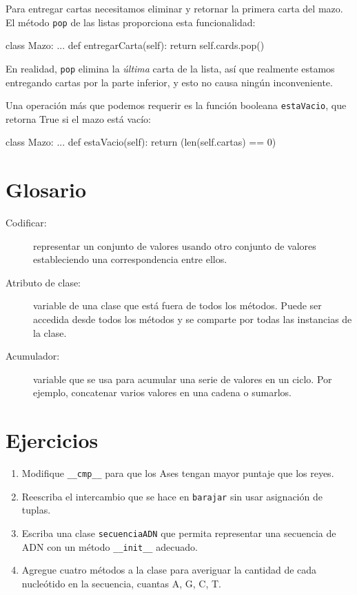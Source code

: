 Para entregar cartas necesitamos eliminar y retornar la primera carta
del mazo. El método \texttt{pop} de las listas proporciona esta funcionalidad:
\begin{pythoncode}
class Mazo:
  ...
  def entregarCarta(self):
    return self.cards.pop()
\end{pythoncode}
 En realidad, \texttt{pop} elimina la {\em última} carta de la
lista, así que realmente estamos entregando cartas por la parte inferior,
y esto no causa ningún inconveniente.

 

Una operación más que podemos requerir es la función booleana \texttt{estaVacio},
que retorna True si el mazo está vacío:

\begin{pythoncode}
class Mazo:
  ...
  def estaVacio(self):
    return (len(self.cartas) == 0)
\end{pythoncode}

\section{Glosario}
\begin{description}
\item [{Codificar:}] representar un conjunto de valores usando otro conjunto
de valores estableciendo una correspondencia entre ellos.
\item [{Atributo de clase:}] variable de una clase que está fuera de todos
los métodos. Puede ser accedida desde todos los métodos y se comparte
por todas las instancias de la clase.
\item [{Acumulador:}] variable que se usa para acumular una serie de valores
en un ciclo. Por ejemplo, concatenar varios valores en una cadena
o sumarlos.

  
\end{description}

\section{Ejercicios}
\begin{enumerate}
\item Modifique \texttt{\_\_cmp\_\_} para que los Ases tengan mayor puntaje
que los reyes.
\item Reescriba el intercambio que se hace en \texttt{barajar} sin usar
asignación de tuplas.
\item Escriba una clase \texttt{secuenciaADN} que permita representar una
secuencia de ADN con un método \texttt{\_\_init\_\_} adecuado.
\item Agregue cuatro métodos a la clase para averiguar la cantidad de cada
nucleótido en la secuencia, cuantas A, G, C, T.
\end{enumerate}

